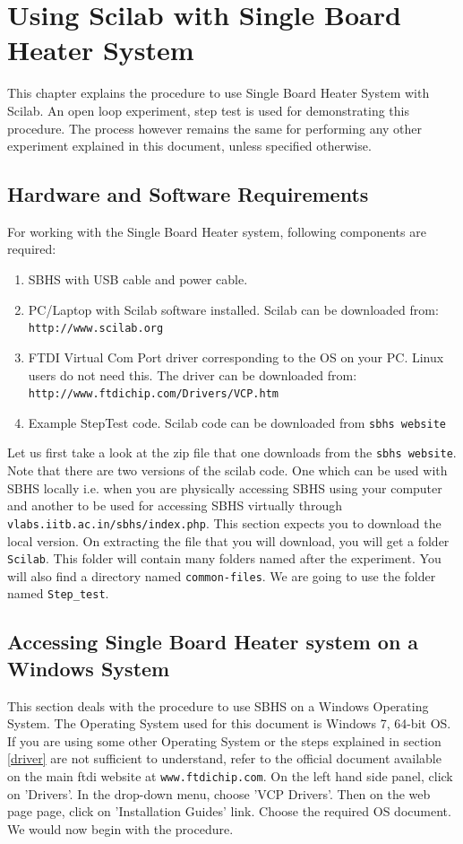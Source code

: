 \chapter{Using Scilab with Single Board Heater System}\label{sercomm}
This chapter explains the procedure to use Single Board Heater System with Scilab. An open loop experiment, step test is used for demonstrating this procedure. The process however remains the same for performing any other experiment explained in this document, unless specified otherwise. 
\section*{Hardware and Software Requirements}\label{umlauts}
For working with the Single Board Heater system, following components are required:

\begin{enumerate}
\item SBHS with USB cable and power cable.
\item PC/Laptop with Scilab software installed. Scilab can be downloaded from:\\ {\tt http://www.scilab.org}
\item FTDI Virtual Com Port driver corresponding to the OS on your PC. Linux users do not need this. The driver can be downloaded from:\\
{\tt http://www.ftdichip.com/Drivers/VCP.htm}
\item Example StepTest code. Scilab code can be downloaded from {\tt sbhs website}
\end{enumerate}
Let us first take a look at the zip file that one downloads from the {\tt sbhs website}. Note that there are two versions of the scilab code. One which can be used with SBHS locally i.e. when you are physically accessing SBHS using your computer and another to be used for accessing SBHS virtually through \\{\tt vlabs.iitb.ac.in/sbhs/index.php}. This section expects you to download the local version. On extracting the file that you will download, you will get a folder {\tt Scilab}. This folder will contain many folders named after the experiment. You will also find a directory named {\tt common-files}. We are going to use the folder named {\tt Step\_test}.

\section{Accessing Single Board Heater system on a Windows System}
\label{win_procedure}
This section deals with the procedure to use SBHS on a Windows Operating System. The Operating System used for this document is Windows 7, 64-bit OS. If you are using some other Operating System or the steps explained in section \ref{driver} are not sufficient to understand, refer to the official document available on the main ftdi website at {\tt www.ftdichip.com}. On the left hand side panel, click on 'Drivers'. In the drop-down menu, choose 'VCP Drivers'. Then on the web page page, click on 'Installation Guides' link. Choose the required OS document. We would now begin with the procedure.
